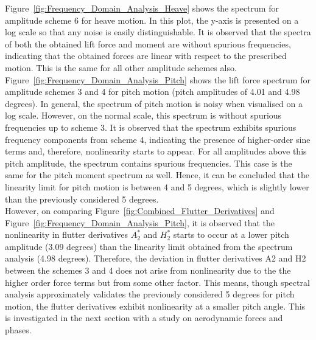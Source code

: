 \documentclass[../main]{subfiles}
\begin{document}
Figure~\ref{fig:Frequency_Domain_Analysis_Heave} shows the spectrum for amplitude scheme 6 for heave motion. In this plot, the y-axis is presented on a log scale so that any noise 
is easily distinguishable. It is observed that the spectra of both the obtained lift force and moment are without spurious frequencies, 
indicating that the obtained forces are linear with respect to the prescribed motion. 
This is the same for all other amplitude schemes also. \\

Figure~\ref{fig:Frequency_Domain_Analysis_Pitch} shows the lift force spectrum for amplitude schemes 3 and 4 for pitch motion (pitch amplitudes of 4.01 and 4.98 degrees). 
In general, the spectrum of pitch motion is noisy when visualised on a log scale. However, on the normal scale, this spectrum is without spurious frequencies up to scheme 3. 
It is observed that the spectrum exhibits spurious frequency components from scheme 4, indicating the presence of higher-order sine terms and, 
therefore, nonlinearity starts to appear. For all amplitudes above this pitch amplitude, the spectrum contains spurious frequencies. 
This case is the same for the pitch moment spectrum as well. Hence, it can be concluded that the linearity limit for pitch motion is between 4 and 5 degrees, 
which is slightly lower than the previously considered 5 degrees. \\

However, on comparing Figure~\ref{fig:Combined_Flutter_Derivatives} and Figure~\ref{fig:Frequency_Domain_Analysis_Pitch}, 
it is observed that the nonlinearity in flutter derivatives $A_2^*$ and $H_2^*$ starts to occur at a lower pitch amplitude (3.09 degrees) 
than the linearity limit obtained from the spectrum analysis (4.98 degrees). 
Therefore, the deviation in flutter derivatives A2 and H2 between the schemes 3 and 4 does not arise from nonlinearity due to the  
the higher order force terms but from some other factor. This means, though spectral analysis approximately validates the previously considered 5 degrees for pitch motion, 
the flutter derivatives exhibit nonlinearity at a smaller pitch angle. This is investigated in the next section with a study on aerodynamic forces and phases. \\
\end{document}
